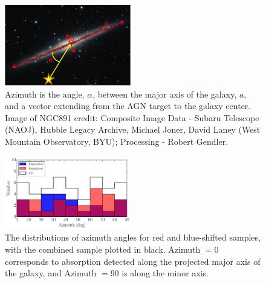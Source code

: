 \documentclass[twocolumn,tighten]{aastex6}
\begin{document}
\begin{figure}[ht!]
        \centering
        \includegraphics[width=0.49\textwidth]{fig11.png}
        \caption{\small{Azimuth is the angle, $\alpha$, between the major axis of the galaxy, $a$, and a vector extending from the AGN target to the galaxy center. Image of NGC891 credit: Composite Image Data - Subaru Telescope (NAOJ), Hubble Legacy Archive, Michael Joner, David Laney (West Mountain Observatory, BYU); Processing - Robert Gendler.}}
        \label{azimuth_illustration}
        \vspace{5pt}
\end{figure} 

\begin{figure}[ht!]
        \centering
        \includegraphics[width=0.49\textwidth]{fig12.pdf}
        \caption{\small{The distributions of azimuth angles for red and blue-shifted samples, with the combined sample plotted in black. Azimuth $= 0$ corresponds to absorption detected along the projected major axis of the galaxy, and Azimuth $= 90$ is along the minor axis.}}
        \label{azimuth_dist}
        \vspace{5pt}
\end{figure}
\end{document}
